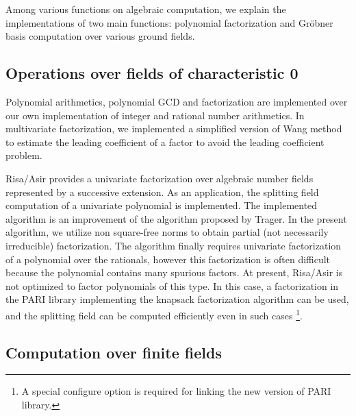 \documentclass[12pt]{article}
\begin{document}
Among various functions on algebraic computation,
we explain the implementations of two main functions: polynomial
factorization and Gr\"obner basis computation over various ground
fields.

\subsection{Operations over fields of characteristic 0}

Polynomial arithmetics, polynomial GCD and factorization are
implemented over our own implementation of integer and rational number
arithmetics.  In multivariate factorization, we implemented a
simplified version of Wang method to estimate the leading coefficient
of a factor to avoid the leading coefficient problem.

Risa/Asir provides a univariate factorization over algebraic number
fields represented by a successive extension.  As an application, the
splitting field computation of a univariate polynomial is implemented.
The implemented algorithm is an improvement of the algorithm proposed
by Trager. In the present algorithm, we utilize non square-free norms
to obtain partial (not necessarily irreducible) factorization. The
algorithm finally requires univariate factorization of a polynomial
over the rationals, however this factorization is often difficult
because the polynomial contains many spurious factors.  At present,
Risa/Asir is not optimized to factor polynomials of this type.  In
this case, a factorization in the PARI library implementing the
knapsack factorization algorithm can be used, and the splitting field
can be computed efficiently even in such cases
\footnote{A special configure option is required for linking the new version
of PARI library.}.

\subsection{Computation over finite fields}
\end{document}
